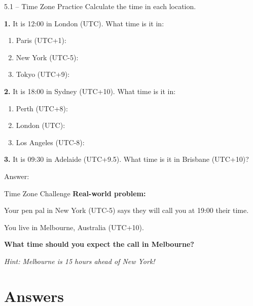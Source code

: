 \documentclass[12pt,a4paper]{article}
\begin{document}
\begin{exercisebox}{5.1 -- Time Zone Practice}
Calculate the time in each location.

\textbf{1.} It is 12:00 in London (UTC). What time is it in:
\begin{enumerate}[label=\alph*)]
\item Paris (UTC+1): \underline{\hspace{3cm}}
\item New York (UTC-5): \underline{\hspace{3cm}}
\item Tokyo (UTC+9): \underline{\hspace{3cm}}
\end{enumerate}

\textbf{2.} It is 18:00 in Sydney (UTC+10). What time is it in:
\begin{enumerate}[label=\alph*)]
\item Perth (UTC+8): \underline{\hspace{3cm}}
\item London (UTC): \underline{\hspace{3cm}}
\item Los Angeles (UTC-8): \underline{\hspace{3cm}}
\end{enumerate}

\textbf{3.} It is 09:30 in Adelaide (UTC+9.5). What time is it in Brisbane (UTC+10)?

Answer: \underline{\hspace{4cm}}
\end{exercisebox}

\begin{challengebox}{Time Zone Challenge}
\textbf{Real-world problem:}

Your pen pal in New York (UTC-5) says they will call you at 19:00 their time.

You live in Melbourne, Australia (UTC+10).

\textbf{What time should you expect the call in Melbourne?}

\textit{Hint: Melbourne is 15 hours ahead of New York!}
\end{challengebox}

\newpage

\section{Answers}
\end{document}
